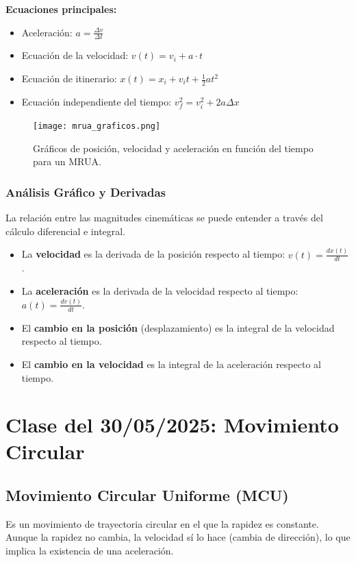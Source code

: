 \documentclass[11pt]{article}
\begin{document}
\textbf{Ecuaciones principales:}
\begin{itemize}
	\item Aceleración: $a = \frac{\Delta v}{\Delta t}$
	\item Ecuación de la velocidad: $v(t) = v_i + a \cdot t$
	\item Ecuación de itinerario: $x(t) = x_i + v_i t + \frac{1}{2}at^2$
	\item Ecuación independiente del tiempo: $v_f^2 = v_i^2 + 2a\Delta x$
\end{itemize}

\begin{figure}[h!]
	\centering
	\texttt{[image: mrua\_graficos.png]}
	\caption{Gráficos de posición, velocidad y aceleración en función del tiempo para un MRUA.}
\end{figure}

\subsubsection{Análisis Gráfico y Derivadas}
La relación entre las magnitudes cinemáticas se puede entender a través del cálculo diferencial e integral.
\begin{itemize}
	\item La \textbf{velocidad} es la derivada de la posición respecto al tiempo: $v(t) = \frac{dx(t)}{dt}$.
	\item La \textbf{aceleración} es la derivada de la velocidad respecto al tiempo: $a(t) = \frac{dv(t)}{dt}$.
	\item El \textbf{cambio en la posición} (desplazamiento) es la integral de la velocidad respecto al tiempo.
	\item El \textbf{cambio en la velocidad} es la integral de la aceleración respecto al tiempo.
\end{itemize}

\newpage

\section{Clase del 30/05/2025: Movimiento Circular}
\subsection{Movimiento Circular Uniforme (MCU)}
Es un movimiento de trayectoria circular en el que la rapidez es constante. Aunque la rapidez no cambia, la velocidad sí lo hace (cambia de dirección), lo que implica la existencia de una aceleración.
\end{document}
